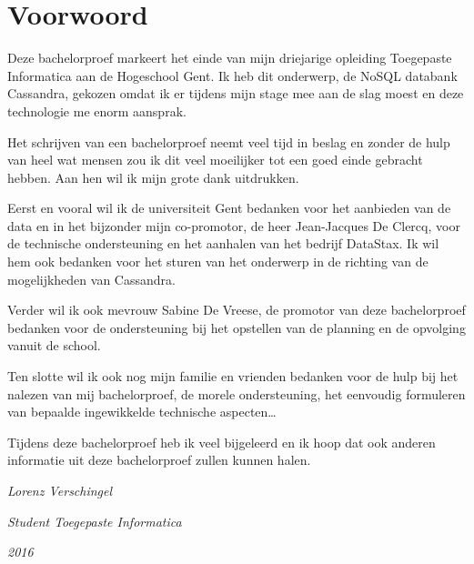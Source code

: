 \chapter*{Voorwoord}
\label{ch:voorwoord}

Deze bachelorproef markeert het einde van mijn driejarige opleiding Toegepaste Informatica aan de Hogeschool Gent.
Ik heb dit onderwerp, de NoSQL databank Cassandra, gekozen omdat ik er tijdens mijn stage mee aan de slag moest en deze technologie me enorm aansprak.

Het schrijven van een bachelorproef neemt veel tijd in beslag en zonder de hulp van heel wat mensen zou ik dit veel moeilijker tot een goed einde gebracht hebben.
Aan hen wil ik mijn grote dank uitdrukken.

Eerst en vooral wil ik de universiteit Gent bedanken voor het aanbieden van de data en in het bijzonder mijn co-promotor, de heer Jean-Jacques De Clercq, voor de technische ondersteuning en het aanhalen van het bedrijf DataStax.
Ik wil hem ook bedanken voor het sturen van het onderwerp in de richting van de mogelijkheden van Cassandra.

Verder wil ik ook mevrouw Sabine De Vreese, de promotor van deze bachelorproef bedanken voor de ondersteuning bij het opstellen van de planning en de opvolging vanuit de school.

Ten slotte wil ik ook nog mijn familie en vrienden bedanken voor de hulp bij het nalezen van mij bachelorproef, de morele ondersteuning, het eenvoudig formuleren van bepaalde ingewikkelde technische aspecten\dots

Tijdens deze bachelorproef heb ik veel bijgeleerd en ik hoop dat ook anderen informatie uit deze bachelorproef zullen kunnen halen.

\vspace{4 em}

\begin{flushright}
	\textit{Lorenz Verschingel}	
\end{flushright}
\begin{flushright}
	\textit{Student Toegepaste Informatica}
\end{flushright}
\begin{flushright}
	\textit{2016}
\end{flushright}